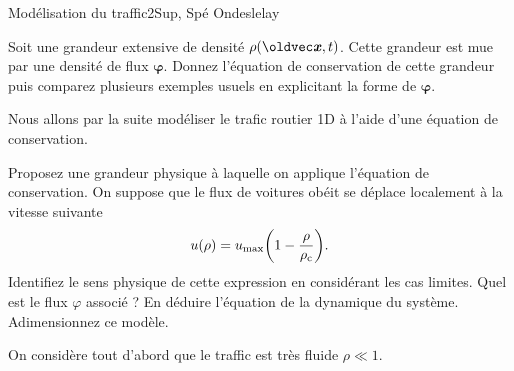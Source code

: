 
\begin{exercise}{Modélisation du traffic}{2}{Sup, Spé}
{Ondes}{lelay}

\begin{questions}
    \questioncours Soit une grandeur extensive de densité $\rho(\vx,t)$. Cette grandeur est mue par une densité de flux $\boldsymbol{\varphi}$. Donnez l'équation de conservation de cette grandeur puis comparez plusieurs exemples usuels en explicitant la forme de $\boldsymbol{\varphi}$.
\begin{EnvUplevel}
Nous allons par la suite modéliser le trafic routier 1D à l'aide d'une équation de conservation.
\end{EnvUplevel}
    \question Proposez une grandeur physique à laquelle on applique l'équation de conservation.
    \question On suppose que le flux de voitures obéit se déplace localement à la vitesse suivante
    $$u(\rho) = u_\text{max}\qty(1 - \dfrac{\rho}{\rho_\text{c}}).$$
    Identifiez le sens physique de cette expression en considérant les cas limites. \question Quel est le flux $\varphi$ associé ? En déduire l'équation de la dynamique du système.
    \question Adimensionnez ce modèle.
    
    \question On considère tout d'abord que le traffic est très fluide $\rho \ll 1$.
    

\end{questions}
\end{exercise}
